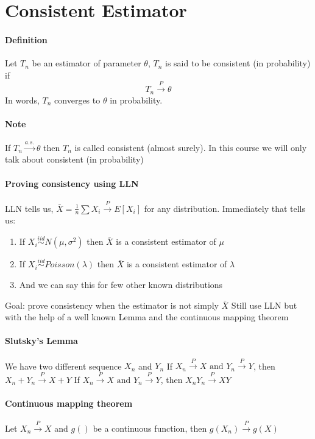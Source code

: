 \documentclass[11pt]{article}
\begin{document}
 \section{Consistent Estimator}
 \paragraph{Definition}
 Let $T_n$ be an estimator of parameter $\theta$, $T_n$ is said to be consistent (in probability) if $$T_n \overset{P}{\rightarrow} \theta$$
 In words, $T_n$ converges to $\theta$ in probability.
 \paragraph{Note}
 If $T_n \overset{a.s.}{\rightarrow}\theta$ then $T_n$ is called consistent (almost surely). In this course we will only talk about consistent (in probability)
 \paragraph{Proving consistency using LLN}
 LLN tells us, $\bar X = \frac{1}{n}\sum X_i \overset{P}{\rightarrow} E[X_i]$ for any distribution. Immediately that tells us:
 \begin{enumerate}
 	\item If $X_i \overset{iid}{\sim} N(\mu,\sigma^2)$ then $\bar X$ is a consistent estimator of $\mu$
 	 \item If $X_i \overset{iid}{\sim} Poisson(\lambda)$ then $\bar X$ is a consistent estimator of $\lambda$
 	 \item And we can say this for few other known distributions
 \end{enumerate}
 Goal: prove consistency when the estimator is not simply $\bar X$
 Still use LLN but with the help of a well known Lemma and the continuous mapping theorem
 \paragraph{Slutsky's Lemma}
 We have two different sequence $X_n$ and $Y_n$ \newline
 If $X_n \overset{P}{\rightarrow}X \mbox{ and } Y_n \overset{P}{\rightarrow}Y$, then $X_n + Y_n \overset{P}{\rightarrow} X + Y$ \newline
 If $X_n \overset{P}{\rightarrow}X \mbox{ and } Y_n \overset{P}{\rightarrow}Y$, then $X_nY_n \overset{P}{\rightarrow} XY$
 \paragraph{Continuous mapping theorem}
 Let $X_n \overset{P}{\rightarrow} X$ and $g()$ be a continuous function, then $g(X_n) \overset{P}{\rightarrow} g(X)$
\end{document}
